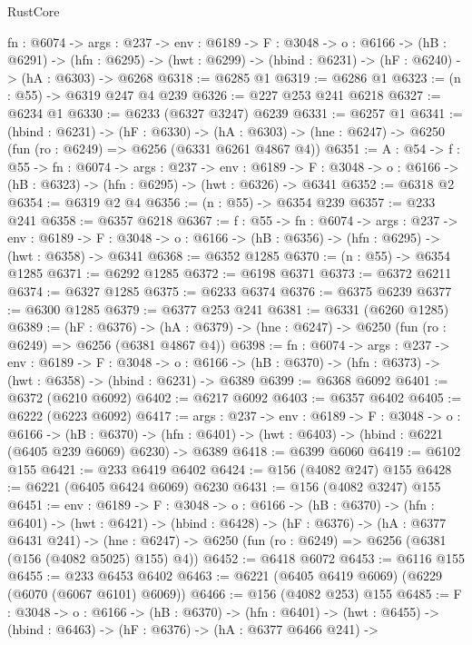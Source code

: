 \begin{lexlean}{RustCore}
\begin{coremodule}
  {fn : @6074} ->
  {args : @237} ->
  {env : @6189} ->
  {F : @3048} ->
  {o : @6166} ->
  (hB : @6291) ->
  (hfn : @6295) -> (hwt : @6299) -> (hbind : @6231) -> (hF : @6240) -> (hA : @6303) -> @6268
@6318 := @6285 @1
@6319 := @6286 @1
@6323 := (n : @55) -> @6319 @247 @4 @239
@6326 := @227 @253 @241 @6218
@6327 := @6234 @1
@6330 := @6233 (@6327 @3247) @6239
@6331 := @6257 @1
@6341 := (hbind : @6231) ->
  (hF : @6330) ->
  (hA : @6303) -> (hne : @6247) -> @6250 (fun (ro : @6249) => @6256 (@6331 @6261 @4867 @4))
@6351 := {A : @54} ->
  {f : @55} ->
  {fn : @6074} ->
  {args : @237} ->
  {env : @6189} ->
  {F : @3048} -> {o : @6166} -> (hB : @6323) -> (hfn : @6295) -> (hwt : @6326) -> @6341
@6352 := @6318 @2
@6354 := @6319 @2 @4
@6356 := (n : @55) -> @6354 @239
@6357 := @233 @241
@6358 := @6357 @6218
@6367 := {f : @55} ->
  {fn : @6074} ->
  {args : @237} ->
  {env : @6189} ->
  {F : @3048} -> {o : @6166} -> (hB : @6356) -> (hfn : @6295) -> (hwt : @6358) -> @6341
@6368 := @6352 @1285
@6370 := (n : @55) -> @6354 @1285
@6371 := @6292 @1285
@6372 := @6198 @6371
@6373 := @6372 @6211
@6374 := @6327 @1285
@6375 := @6233 @6374
@6376 := @6375 @6239
@6377 := @6300 @1285
@6379 := @6377 @253 @241
@6381 := @6331 (@6260 @1285)
@6389 := (hF : @6376) ->
  (hA : @6379) -> (hne : @6247) -> @6250 (fun (ro : @6249) => @6256 (@6381 @4867 @4))
@6398 := {fn : @6074} ->
  {args : @237} ->
  {env : @6189} ->
  {F : @3048} ->
  {o : @6166} -> (hB : @6370) -> (hfn : @6373) -> (hwt : @6358) -> (hbind : @6231) -> @6389
@6399 := @6368 @6092
@6401 := @6372 (@6210 @6092)
@6402 := @6217 @6092
@6403 := @6357 @6402
@6405 := @6222 (@6223 @6092)
@6417 := {args : @237} ->
  {env : @6189} ->
  {F : @3048} ->
  {o : @6166} ->
  (hB : @6370) ->
  (hfn : @6401) -> (hwt : @6403) -> (hbind : @6221 (@6405 @239 @6069) @6230) -> @6389
@6418 := @6399 @6060
@6419 := @6102 @155
@6421 := @233 @6419 @6402
@6424 := @156 (@4082 @247) @155
@6428 := @6221 (@6405 @6424 @6069) @6230
@6431 := @156 (@4082 @3247) @155
@6451 := {env : @6189} ->
  {F : @3048} ->
  {o : @6166} ->
  (hB : @6370) ->
  (hfn : @6401) ->
  (hwt : @6421) ->
  (hbind : @6428) ->
  (hF : @6376) ->
  (hA : @6377 @6431 @241) ->
  (hne : @6247) -> @6250 (fun (ro : @6249) => @6256 (@6381 (@156 (@4082 @5025) @155) @4))
@6452 := @6418 @6072
@6453 := @6116 @155
@6455 := @233 @6453 @6402
@6463 := @6221 (@6405 @6419 @6069) (@6229 (@6070 (@6067 @6101) @6069))
@6466 := @156 (@4082 @253) @155
@6485 := {F : @3048} ->
  {o : @6166} ->
  (hB : @6370) ->
  (hfn : @6401) ->
  (hwt : @6455) ->
  (hbind : @6463) ->
  (hF : @6376) ->
  (hA : @6377 @6466 @241) ->

\end{coremodule}
\end{lexlean}
